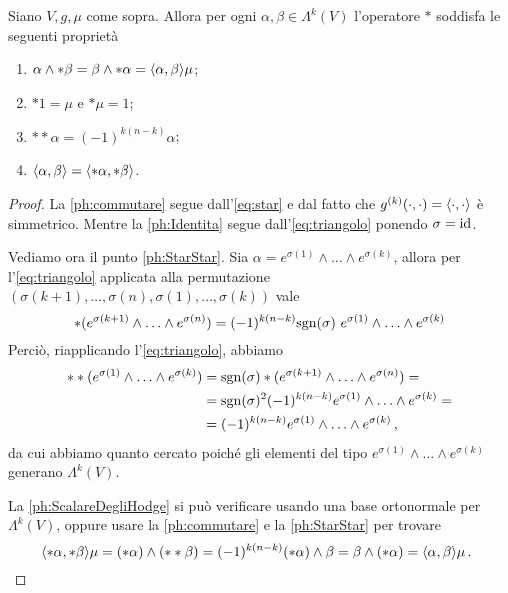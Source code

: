 \begin{proposition} \label{prop:ProprietaHodge}
	Siano $V,g,\mu$ come sopra. Allora per ogni $\alpha,\beta\in\Lambda^k(V)$ l'operatore $*$ soddisfa le seguenti proprietà
	\begin{enumerate}
		\item $\alpha\wedge *\beta = \beta \wedge * \alpha = \langle \alpha , \beta \rangle \mu$; \label{ph:commutare}
		\item $*1 = \mu$ e $*\mu=1$; \label{ph:Identita}
		\item $**\alpha = (-1)^{k(n-k)} \alpha$; \label{ph:StarStar}
		\item $\langle \alpha , \beta \rangle = \langle *\alpha , *\beta \rangle$. \label{ph:ScalareDegliHodge}
	\end{enumerate}
\end{proposition}
\begin{proof}
	La \ref{ph:commutare} segue dall'\cref{eq:star} e dal fatto che $g^{(k)}(\cdot,\cdot)=\langle \cdot , \cdot \rangle$ è simmetrico.
	Mentre la \ref{ph:Identita} segue dall'\cref{eq:triangolo} ponendo $\sigma = \mathrm{id}$.
	
	Vediamo ora il punto \ref{ph:StarStar}. Sia $\alpha = e^{\sigma(1)}\wedge \ldots \wedge e^{\sigma(k)}$, allora per l'\cref{eq:triangolo} applicata alla permutazione $(\sigma(k+1),\ldots,\sigma(n),\sigma(1),\ldots,\sigma(k))$ vale 
	\begin{equation*}
		*(e^{\sigma(k+1)} \wedge\ldots\wedge e^{\sigma(n)}) = (-1)^{k(n-k)}\mathrm{sgn}(\sigma) \ e^{\sigma(1)} \wedge\ldots\wedge e^{\sigma(k)}
	\end{equation*}
% 	
	Perciò, riapplicando l'\cref{eq:triangolo}, abbiamo
	\begin{align*}
	**(e^{\sigma(1)} \wedge\ldots\wedge e^{\sigma(k)}) &= \mathrm{sgn}(\sigma) * (e^{\sigma(k+1)} \wedge\ldots\wedge e^{\sigma(n)}) =\\
	&=\mathrm{sgn}(\sigma)^2 (-1)^{k(n-k)} e^{\sigma(1)} \wedge\ldots\wedge e^{\sigma(k)} =\\
	&=(-1)^{k(n-k)} e^{\sigma(1)} \wedge\ldots\wedge e^{\sigma(k)} \, \text{, }
	\end{align*}
	da cui abbiamo quanto cercato poiché gli elementi del tipo $e^{\sigma(1)}\wedge \ldots \wedge e^{\sigma(k)}$ generano $\Lambda^k(V)$.
	
	La \ref{ph:ScalareDegliHodge} si può verificare usando una base ortonormale per $\Lambda^k(V)$, oppure usare la \ref{ph:commutare} e la \ref{ph:StarStar} per trovare
	\begin{equation*}
		\langle *\alpha , *\beta \rangle \mu = (*\alpha) \wedge (**\beta) = (-1)^{k(n-k)} (*\alpha)\wedge\beta = \beta\wedge (*\alpha) = \langle \alpha , \beta \rangle \mu\, \text{. }
	\end{equation*}
\end{proof}


